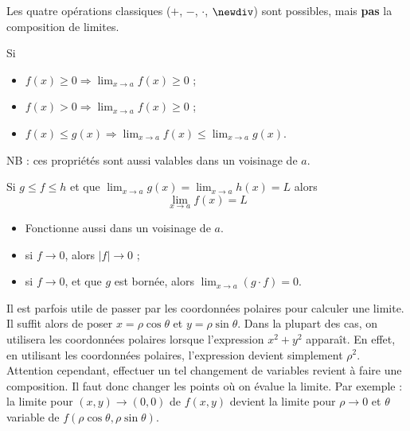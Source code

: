 \begin{myform}
	Les quatre opérations classiques ($+$, $-$, $\cdot$, $\newdiv$) sont possibles, mais \textbf{pas} la composition de limites.
\end{myform}

\begin{myprop}[Positivité] Si
	\begin{itemize}
		\item $f(x) \geq 0 \Rightarrow \lim_{x \to a} f(x) \geq 0$ ;
		\item $f(x) > 0 \Rightarrow \lim_{x \to a} f(x) \geq 0$ ;
		\item $f(x) \leq g(x) \Rightarrow \lim_{x \to a} f(x) \leq \lim_{x \to a} g(x)$.
	\end{itemize}
	NB : ces propriétés sont aussi valables dans un voisinage de $a$.
\end{myprop}

\begin{myprop}
	Si $g \leq f \leq h$ et que $\lim_{x \to a} g(x) = \lim_{x \to a} h(x) = L$ alors
	\[ \lim_{x \to a} f(x) = L \]
	\begin{itemize}
		\item Fonctionne aussi dans un voisinage de $a$.
	\end{itemize}
\end{myprop}

\begin{myform}\InsertTheoremBreak
	\begin{itemize}
		\item si $f \rightarrow 0$, alors $|f| \rightarrow 0$ ;
		\item si $f \to 0$, et que $g$ est bornée, alors $\lim_{x \to a} (g \cdot f) = 0$.
	\end{itemize}
\end{myform}

\begin{myrem}
	Il est parfois utile de passer par les coordonnées polaires pour calculer une limite. Il suffit
	alors de poser $x = \rho \cos \theta$ et $y = \rho \sin \theta$. Dans la plupart des cas, on
	utilisera les coordonnées polaires lorsque l'expression $x^2 + y^2$ apparaît. En effet, en
	utilisant les coordonnées polaires, l'expression devient simplement $\rho^2$.
	Attention cependant, effectuer un tel changement de variables revient à faire une composition.
	Il faut donc changer les points où on évalue la limite. Par exemple : la limite pour
	$(x, y) \rightarrow (0, 0)$ de $f(x, y)$ devient la limite pour $\rho \rightarrow 0$ et $\theta$
	variable de $f(\rho \cos \theta, \rho \sin \theta)$.
\end{myrem}

